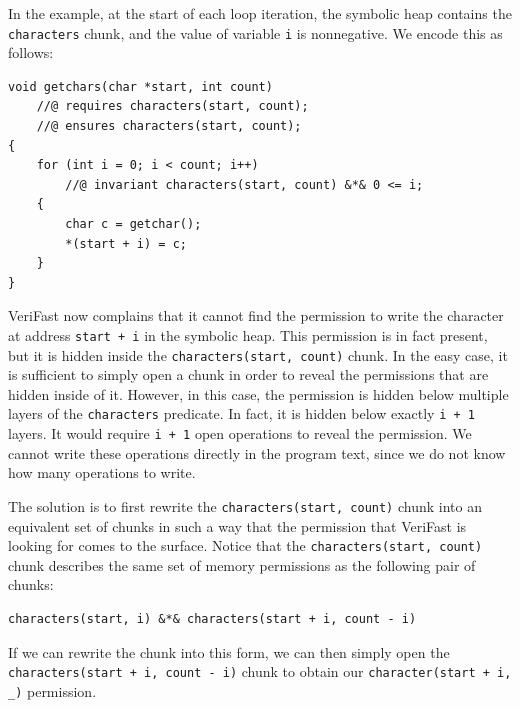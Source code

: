 \documentclass{article}
\begin{document}
In the example, at the start of each loop iteration, the symbolic heap contains the \lstinline!characters! chunk, and the value of variable
\lstinline!i! is nonnegative. We encode this as follows:
\begin{lstlisting}
void getchars(char *start, int count)
    //@ requires characters(start, count);
    //@ ensures characters(start, count);
{
    for (int i = 0; i < count; i++)
        //@ invariant characters(start, count) &*& 0 <= i;
    {
        char c = getchar();
        *(start + i) = c;
    }
}
\end{lstlisting}
VeriFast now complains that it cannot find the permission to write the character at address \lstinline!start + i! in the symbolic heap.
This permission is in fact present, but it is hidden inside the \lstinline!characters(start, count)! chunk. In the easy case, it is sufficient
to simply open a chunk in order to reveal the permissions that are hidden inside of it. However, in this case, the permission is hidden below
multiple layers of the \lstinline!characters! predicate. In fact, it is hidden below exactly \lstinline!i + 1! layers. It would require
\lstinline!i + 1! open operations to reveal the permission. We cannot write these operations directly in the program text, since we do not know
how many operations to write.

The solution is to first rewrite the \lstinline!characters(start, count)! chunk into an equivalent set of chunks
in such a way that the permission that VeriFast is looking for comes to the surface. Notice that the \lstinline!characters(start, count)! chunk describes the same set of
memory permissions as the following pair of chunks:
\begin{lstlisting}
characters(start, i) &*& characters(start + i, count - i)
\end{lstlisting}
If we can rewrite the chunk into this form, we can then simply open the \lstinline!characters(start + i, count - i)! chunk to obtain our
\lstinline!character(start + i, _)! permission.
\end{document}

